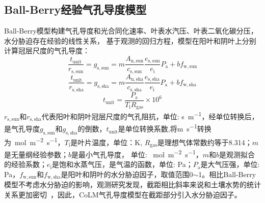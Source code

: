 \subsection{Ball-Berry经验气孔导度模型}



Ball-Berry模型构建气孔导度和光合同化速率、叶表水汽压、叶表二氧化碳分压，水分胁迫存在经验的线性关系，
基于观测的回归方程，模型在阳叶和阴叶上分别计算冠层尺度的气孔导度：
\begin{equation}\label{rs_a1sun}
\frac{t_{\mathrm{unit}}}{r_{\mathrm{s,sun}}}=g_{\mathrm{s,sun}}=m \frac{A_{\mathrm{n,sun}}}{c_{\mathrm{s,sun}}} \frac{e_{\mathrm{s,sun}}}{e_{\mathrm{i}}} P_{\mathrm {a}}+bf_{\mathrm{w,sun}}
\end{equation}
\begin{equation}\label{rs_a1sha}
\frac{t_{\mathrm{unit}}}{r_{\mathrm{s,sha}}}=g_{\mathrm{s,sha}}=m \frac{A_{\mathrm{n,sha}}}{c_{\mathrm{s,sha}}} \frac{e_{\mathrm{s,sha}}}{e_{\mathrm{i}}} P_{\mathrm {a}}+bf_{\mathrm{w,sha}}
\end{equation}
\begin{equation}\label{tunit}
t_{\mathrm{unit}}=\frac{P_{\mathrm{a}}}{T_{\mathrm{l}}R_{\mathrm{gas}}}\times 10^6
\end{equation}
$r_{\mathrm{s,sun}}$和$r_{\mathrm{s,sha}}$代表阳叶和阴叶冠层尺度的气孔阻抗，单位: \unit{s.m^{-1}}，经单位转换后，是气孔导度$g_{\mathrm{s,sun}}$和$g_{\mathrm{s,sha}}$的倒数，$t_{\mathrm{unit}}$是单位转换系数,将\unit{m.s^{-1}}转换为\unit{\mu.mol.m^{-2}.s^{-1}}，$T_{\mathrm{l}}$是叶片温度，单位：\unit{K}, $R_{\mathrm{gas}}$是理想气体常数约等于8.314；$m$是无量纲经验参数；$b$是最小气孔导度，
单位: \unit{\mu.mol.m^{-2}.s^{-1}}，$m$和$b$是观测拟合的经验系数；$e_{\mathrm {i}}$是饱和水蒸气压，是气温的函数，单位: Pa；$P_{\mathrm {a}}$是大气压强，单位: Pa，$f_{\mathrm{w,sun}}$和$f_{\mathrm{w,sha}}$是阳叶和阴叶的水分胁迫因子，取值范围0$\sim$1。相比Ball-Berry模型不考虑水分胁迫的影响，观测研究发现，截距相比斜率来说和土壤水势的统计关系更加密切~\citep{Misson2004,Medlyn2011}，因此，CoLM气孔导度模型在截距部分引入水分胁迫因子。



